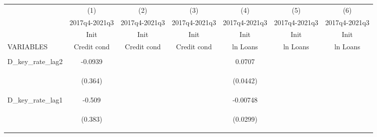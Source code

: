 \documentclass[]{article}
\begin{document}
\begin{center}
\begin{tabular}{lcccccc} \hline
 & (1) & (2) & (3) & (4) & (5) & (6) \\
 & 2017q4-2021q3 & 2017q4-2021q3 & 2017q4-2021q3 & 2017q4-2021q3 & 2017q4-2021q3 & 2017q4-2021q3 \\
 & Init & Init & Init & Init & Init & Init \\
VARIABLES & Credit cond & Credit cond & Credit cond & ln Loans & ln Loans & ln Loans \\ \hline
\vspace{4pt} & \begin{footnotesize}\end{footnotesize} & \begin{footnotesize}\end{footnotesize} & \begin{footnotesize}\end{footnotesize} & \begin{footnotesize}\end{footnotesize} & \begin{footnotesize}\end{footnotesize} & \begin{footnotesize}\end{footnotesize} \\
D\_key\_rate\_lag2 & -0.0939 &  &  & 0.0707 &  &  \\
\vspace{4pt} & \begin{footnotesize}(0.364)\end{footnotesize} & \begin{footnotesize}\end{footnotesize} & \begin{footnotesize}\end{footnotesize} & \begin{footnotesize}(0.0442)\end{footnotesize} & \begin{footnotesize}\end{footnotesize} & \begin{footnotesize}\end{footnotesize} \\
D\_key\_rate\_lag1 & -0.509 &  &  & -0.00748 &  &  \\
\vspace{4pt} & \begin{footnotesize}(0.383)\end{footnotesize} & \begin{footnotesize}\end{footnotesize} & \begin{footnotesize}\end{footnotesize} & \begin{footnotesize}(0.0299)\end{footnotesize} & \begin{footnotesize}\end{footnotesize} & \begin{footnotesize}\end{footnotesize} \\

\end{tabular}
\end{center}
\end{document}
